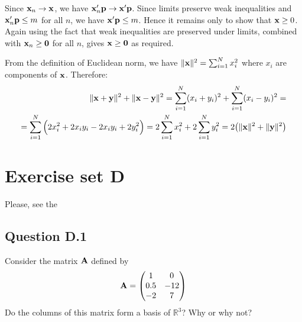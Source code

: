 \documentclass[letterpaper,10pt,english]{jupyterBook}
\begin{document}
\sphinxAtStartPar
Since \({\bf x}_n \to {\bf x}\), we have
\({\bf x}_n' {\bf p} \to {\bf x}' {\bf p}\). Since limits preserve weak
inequalities and \({\bf x}_n' {\bf p} \leq m\) for all \(n\), we have
\({\bf x}' {\bf p} \leq m\). Hence it remains only to show that \({\bf x} \geq
0\). Again using the fact that weak inequalities are preserved under
limits, combined with \({\bf x}_n \geq {\bf 0}\) for all \(n\), gives
\({\bf x} \geq {\bf 0}\) as required.

\sphinxAtStartPar
{}

\sphinxAtStartPar
From the definition of Euclidean norm, we have \(\|{\bf x}\|^2 = \sum_{i=1}^{N}x_i^2\) where \(x_i\) are components of \({\bf x}\). Therefore:
\begin{equation*}
\begin{split}
\| {\bf x} + {\bf y} \|^2 + \| {\bf x} - {\bf y} \|^2 = \sum_{i=1}^{N}(x_i+y_i)^2 + \sum_{i=1}^{N}(x_i-y_i)^2 = \\
= \sum_{i=1}^{N} \Big( 2 x_i^2 + 2 x_i y_i - 2 x_i y_i + 2 y_i^2 \Big) = 2 \sum_{i=1}^{N}x_i^2 + 2 \sum_{i=1}^{N}y_i^2 = 2 \big( \| {\bf x} \|^2 + \| {\bf y} \|^2 \big)
\end{split}
\end{equation*}
\sphinxstepscope


\chapter{Exercise set D}
\label{\detokenize{05.exercises.D:exercise-set-d}}\label{\detokenize{05.exercises.D::doc}}
\sphinxAtStartPar
Please, see the
{\hyperref[\detokenize{02.exercises.A::doc}]{}}


\section{Question D.1}
\label{\detokenize{05.exercises.D:question-d-1}}
\sphinxAtStartPar
Consider the matrix \({\bf A}\) defined by
\begin{equation*}
\begin{split}
%
{\bf A} = 
\begin{pmatrix}
1 & 0 \\
0.5 & -12 \\
-2 & 7 
\end{pmatrix}
%
\end{split}
\end{equation*}
\sphinxAtStartPar
Do the columns of this matrix form a basis of \(\mathbb{R}^3\)? Why or why not?
\end{document}
